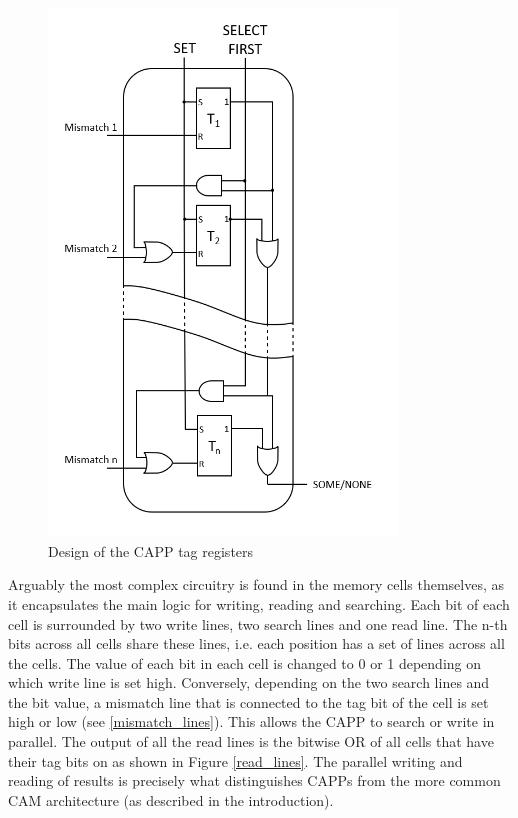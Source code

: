 \begin{figure}
  \includegraphics[height=14cm]{FPGA-CAPP_research_paper/images/tag_registers.png}
  \caption{Design of the CAPP tag registers}
  \label{tag_registers}
\end{figure}

Arguably the most complex circuitry is found in the memory cells themselves, as it encapsulates the main logic for writing, reading and searching. Each bit of each cell is surrounded by two write lines, two search lines and one read line. The n-th bits across all cells share these lines, i.e. each position has a set of lines across all the cells. The value of each bit in each cell is changed to 0 or 1 depending on which write line is set high. Conversely, depending on the two search lines and the bit value, a mismatch line that is connected to the tag bit of the cell is set high or low  (see \ref{mismatch_lines}). This allows the CAPP to search or write in parallel. The output of all the read lines is the bitwise OR of all cells that have their tag bits on as shown in Figure \ref{read_lines}. The parallel writing and reading of results is precisely what distinguishes CAPPs from the more common CAM architecture (as described in the introduction).

